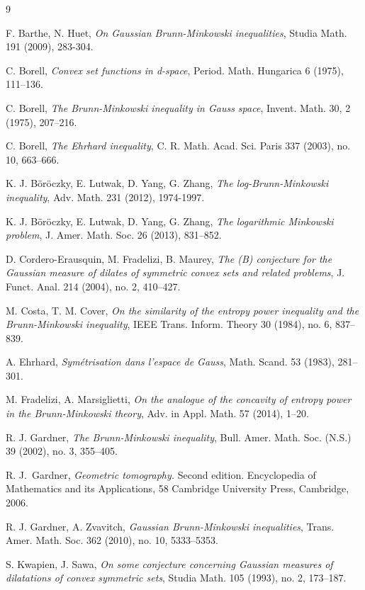 \documentclass[11pt]{article}
\newcommand{\1}{\mathbf{{1}}}
\theoremstyle{definition}
\begin{document}
\begin{thebibliography}{9}


 F. Barthe, N. Huet, \emph{On Gaussian Brunn-Minkowski inequalities}, Studia Math. 191 (2009),
283-304.

 C. Borell, \emph{Convex set functions in d-space}, Period. Math. Hungarica 6 (1975), 111–136.

 C. Borell, \emph{The Brunn-Minkowski inequality in Gauss space}, Invent. Math. 30, 2 (1975), 207–216.

 C. Borell,
\emph{The Ehrhard inequality},
C. R. Math. Acad. Sci. Paris 337 (2003), no. 10, 663–666.

 K. J. B\"or\"oczky, E. Lutwak, D. Yang, G. Zhang, \emph{The log-Brunn-Minkowski inequality}, Adv. Math. 231 (2012), 1974-1997.

  K. J. B\"or\"oczky, E. Lutwak, D. Yang, G. Zhang, \emph{The logarithmic Minkowski problem}, J. Amer. Math. Soc. 26
(2013), 831–852.


 D. Cordero-Erausquin, M. Fradelizi, B. Maurey, \emph{The (B) conjecture for the Gaussian
measure of dilates of symmetric convex sets and related problems}, J. Funct. Anal. 214 (2004), no. 2, 410–427.

 M. Costa, T. M. Cover, \emph{On the similarity of the entropy power inequality
and the Brunn-Minkowski inequality}, IEEE Trans. Inform. Theory 30 (1984), no. 6, 837--839.

 A. Ehrhard, \emph{Sym\'etrisation dans l'espace de Gauss}, Math. Scand. 53 (1983), 281–301.

 M. Fradelizi, A. Marsiglietti, \emph{On the analogue of the concavity of entropy power in the Brunn-Minkowski theory},
Adv. in Appl. Math. 57 (2014), 1–20.

  R. J. Gardner, \emph{The Brunn-Minkowski inequality}, Bull. Amer. Math. Soc. (N.S.) 39 (2002), no. 3, 355--405.

  R.  J.~Gardner, {\em Geometric tomography.} Second edition. Encyclopedia of
Mathematics and its Applications, 58 Cambridge University
Press, Cambridge, 2006.


  R. J. Gardner, A. Zvavitch,  \emph{Gaussian Brunn-Minkowski inequalities}, Trans. Amer. Math. Soc. 362 (2010), no. 10, 5333–5353.

 S. Kwapien, J. Sawa,
\emph{On some conjecture concerning Gaussian measures of dilatations of convex symmetric sets},
Studia Math. 105 (1993), no. 2, 173–187.


\end{thebibliography}
\end{document}
